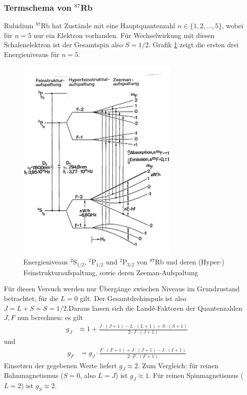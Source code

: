\documentclass[../1-Grundlagenteil.tex]{subfiles}
\begin{document}
\subsubsection*{Termschema von $^{87}$Rb}
    Rubidium $^{87}$Rb hat Zustände mit eine Hauptquantenzahl $n\in\{1,2,...,5\}$, wobei für $n=5$ nur ein Elektron vorhanden. Für Wechselwirkung mit diesen Schalenelektron ist der Gesamtspin also $S=1/2$. Grafik \ref{fig:Rb87Termschema} zeigt die ersten drei Energieniveaus für $n=5$.

    \begin{figure}[H]
        \centering
        \includegraphics[width=8cm]{../../Bilddateien/Grundlagen/Rb87Termschema.jpg}
        \caption{Energieniveaus $^2\text{S}_{1/2}$, $^2\text{P}_{1/2}$ und $^2\text{P}_{3/2}$ von $^{87}$Rb und deren (Hyper-) Feinstrukturaufspaltung, sowie deren Zeeman-Aufspaltung \cite[p.171]{Schneider}}
        \label{fig:Rb87Termschema}
    \end{figure}

    Für diesen Versuch werden nur Übergänge zwischen Niveaus im Grundzustand betrachtet, für die $L=0$ gilt. Der Gesamtdrehimpuls ist also $J=L+S=S=1/2$.Daraus lassen sich die Landé-Faktoren der Quantenzahlen $J,F$ nun berechnen: es gilt
    \begin{align*}
        g_J &\approx 1 + \frac{J\cdot(J + 1) - L\cdot(L + 1) + S\cdot (S + 1)}{2\cdot J\cdot (J + 1)}
    \end{align*}
    und 
    \begin{align*}
        g_F &= g_J\cdot \frac{F\cdot(F + 1) + J\cdot(J + 1) - I\cdot (I + 1)}{2\cdot F\cdot (F + 1)}
    \end{align*}
    Einsetzen der gegebenen Werte liefert $g_J \approx 2$. Zum Vergleich: für reinen Bahnmagnetismus ($S=0$, also $L=J$) ist $g_J\approx 1$. Für reinen Spinmagnetismus ($L=2$) ist $g_S\approx 2$.\\
\end{document}
